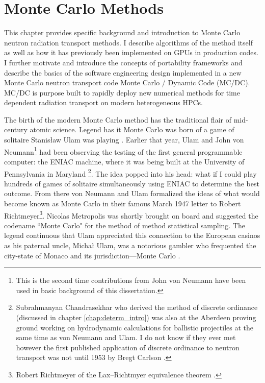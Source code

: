 \chapter{Monte Carlo Methods}


\label{chap:mc_methods_intro}


This chapter provides specific background and introduction to Monte Carlo neutron radiation transport methods.
I describe algorithms of the method itself as well as how it has previously been implemented on GPUs in production codes.
I further motivate and introduce the concepts of portability frameworks and describe the basics of the software engineering design implemented in a new Monte Carlo neutron transport code Monte Carlo / Dynamic Code (MC/DC).
MC/DC is purpose built to rapidly deploy new numerical methods for time dependent radiation transport on modern heterogeneous HPCs.

The birth of the modern Monte Carlo method has the traditional flair of mid-century atomic science.
Legend has it Monte Carlo was born of a game of solitaire Stanisław Ulam was playing \cite{metropolis_1987_history}.
Earlier that year, Ulam and John von Neumann\footnote{This is the second time contributions from John von Neumann have been used in basic background of this dissertation.}
had been observing the testing of the first general programmable computer: the ENIAC machine, where it was being built at the University of Pennsylvania in Maryland \cite{anderson_1986_maniac}\footnote{Subrahmanyan Chandrasekhar who derived the method of discrete ordinance (discussed in chapter \ref{chap:determ_intro}) was also at the Aberdeen proving ground working on hydrodynamic calculations for ballistic projectiles at the same time as von Neumann and Ulam. I do not know if they ever met however the first published application of discrete ordinance to neutron transport was not until 1953 by Bregt Carlson \cite{carlson_1955_sn, carlson_1958_sn}.
}.
The idea popped into his head: what if I could play hundreds of games of solitaire simultaneously using ENIAC to determine the best outcome.
From there von Neumann and Ulam formalized the ideas of what would become known as Monte Carlo in their famous March 1947 letter to Robert Richtmeyer\footnote{
Robert Richtmeyer of the Lax–Richtmyer equivalence theorem \cite{Lax_1956_stability}.
}.
Nicolas Metropolis was shortly brought on board and suggested the codename ``Monte Carlo" for the method of method statistical sampling.
The legend continuous that Ulam appreciated this connection to the European casinos as his paternal uncle, Michał Ulam, was a notorious gambler who frequented the city-state of Monaco and its jurisdiction---Monte Carlo \cite{anderson_1986_maniac}.

